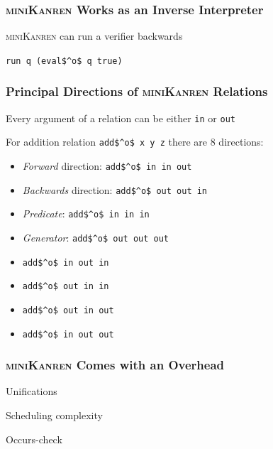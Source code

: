 \documentclass[xcolor=table]{beamer}
\newcommand{\mk}{\textsc{miniKanren}\xspace}
\begin{document}
\begin{frame}[fragile]
  \frametitle{\mk Works as an Inverse Interpreter}

\begin{center}
\mk can run a verifier backwards
\end{center}

\begin{center}
\begin{minipage}{0.3\textwidth}
  \lstinline{run q (eval$^o$ q true)}
\end{minipage}
\end{center}


\end{frame}

\begin{frame}[fragile]
  \frametitle{Principal Directions of \mk Relations}
\begin{center}
  Every argument of a relation can be either \lstinline{in} or \lstinline{out}
\end{center}

\begin{center}
  For addition relation \lstinline{add$^o$ x y z} there are 8 directions:
\end{center}

\begin{itemize}
  \item \emph{Forward} direction: \lstinline{add$^o$ in in out}
  \item \emph{Backwards} direction: \lstinline{add$^o$ out out in}
  \item \emph{Predicate}: \lstinline{add$^o$ in in in}
  \item \emph{Generator}: \lstinline{add$^o$ out out out}
  \item \lstinline{add$^o$ in out in}
  \item \lstinline{add$^o$ out in in}
  \item \lstinline{add$^o$ out in out}
  \item \lstinline{add$^o$ in out out}
\end{itemize}
\end{frame}

\begin{frame}[fragile]
  \frametitle{\mk Comes with an Overhead}
  \begin{center}
    Unifications
  \end{center}

  \begin{center}
    Scheduling complexity
  \end{center}

  \begin{center}
    Occurs-check
  \end{center}
\end{frame}
\end{document}
